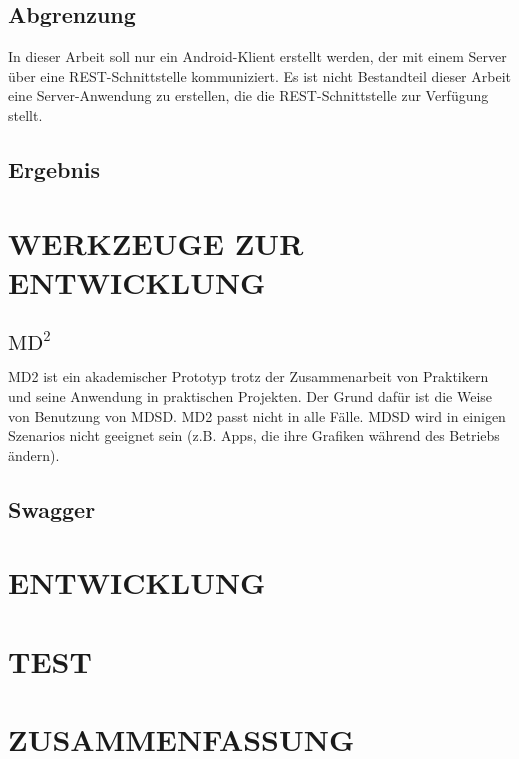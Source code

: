 \documentclass[a4paper,twoside]{article}
\begin{document}
\subsection{Abgrenzung}
In dieser Arbeit soll nur ein Android-Klient erstellt werden, der mit einem Server \"uber eine REST-Schnittstelle kommuniziert. Es ist nicht Bestandteil dieser Arbeit eine Server-Anwendung zu erstellen, die die REST-Schnittstelle zur Verf\"ugung stellt.\\

\subsection{Ergebnis}


\section{\uppercase{Werkzeuge zur Entwicklung}}

\subsection{$\text{MD}^2$}
MD2 ist ein akademischer Prototyp trotz der Zusammenarbeit von  
Praktikern und seine Anwendung in praktischen Projekten. Der Grund 
daf\"ur ist die Weise von Benutzung von MDSD. MD2 passt nicht in alle F\"alle. MDSD wird in einigen Szenarios nicht geeignet sein (z.B. Apps, die ihre Grafiken w\"ahrend des Betriebs ändern).
\cite{MDCP2015}

\subsection{Swagger}

\section{\uppercase{Entwicklung}}

\section{\uppercase{Test}}

\section{\uppercase{Zusammenfassung}}



\small

\end{document}
